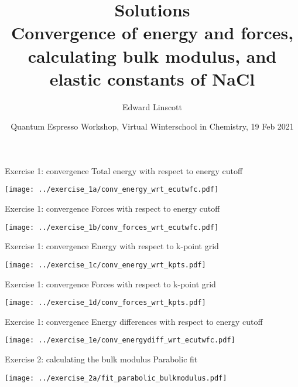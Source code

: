 \documentclass[xcolor=table]{beamer}
\title{\noindent\Large\textbf{Solutions}\\
\footnotesize\textbf{Convergence of energy and forces, calculating bulk modulus, and elastic constants of NaCl}}
\author{Edward Linscott}
\date{Quantum Espresso Workshop, Virtual Winterschool in Chemistry, 19 Feb 2021}
\begin{document}
\begin{frame}
  \titlepage
\end{frame}

\begin{frame}{Exercise 1: convergence}
  Total energy with respect to energy cutoff
  \begin{center}
    \texttt{[image: ../exercise\_1a/conv\_energy\_wrt\_ecutwfc.pdf]}
  \end{center}
\end{frame}

\begin{frame}{Exercise 1: convergence}
  Forces with respect to energy cutoff
  \begin{center}
    \texttt{[image: ../exercise\_1b/conv\_forces\_wrt\_ecutwfc.pdf]}
  \end{center}
\end{frame}

\begin{frame}{Exercise 1: convergence}
  Energy with respect to k-point grid
  \begin{center}
    \texttt{[image: ../exercise\_1c/conv\_energy\_wrt\_kpts.pdf]}
  \end{center}
\end{frame}

\begin{frame}{Exercise 1: convergence}
  Forces with respect to k-point grid
  \begin{center}
    \texttt{[image: ../exercise\_1d/conv\_forces\_wrt\_kpts.pdf]}
  \end{center}
\end{frame}

\begin{frame}{Exercise 1: convergence}
  Energy differences with respect to energy cutoff
  \begin{center}
    \texttt{[image: ../exercise\_1e/conv\_energydiff\_wrt\_ecutwfc.pdf]}
  \end{center}
\end{frame}

\begin{frame}{Exercise 2: calculating the bulk modulus}
  Parabolic fit
  \begin{center}
    \texttt{[image: ../exercise\_2a/fit\_parabolic\_bulkmodulus.pdf]}
  \end{center}
\end{frame}
\end{document}
